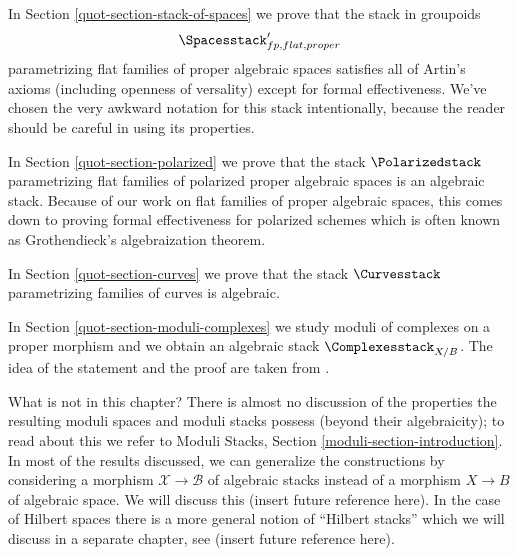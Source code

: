 \medskip\noindent
In Section \ref{quot-section-stack-of-spaces} we prove that the stack in
groupoids
$$
\Spacesstack'_{fp, flat, proper}
$$
parametrizing flat families of proper algebraic spaces satisfies all
of Artin's axioms (including openness of versality) except for
formal effectiveness. We've chosen the very awkward notation for
this stack intentionally, because the reader should be careful
in using its properties.

\medskip\noindent
In Section \ref{quot-section-polarized} we prove that the stack
$\Polarizedstack$
parametrizing flat families of polarized proper algebraic spaces
is an algebraic stack. Because of our work on flat families of proper
algebraic spaces, this comes down to proving
formal effectiveness for polarized schemes which is often known
as Grothendieck's algebraization theorem.

\medskip\noindent
In Section \ref{quot-section-curves} we prove that the stack
$\Curvesstack$ parametrizing families of curves is algebraic.

\medskip\noindent
In Section \ref{quot-section-moduli-complexes}
we study moduli of complexes on a proper morphism
and we obtain an algebraic stack $\Complexesstack_{X/B}$.
The idea of the statement and the proof are taken from
\cite{lieblich-complexes}.

\medskip\noindent
What is not in this chapter? There is almost no discussion of
the properties the resulting moduli spaces and moduli stacks
possess (beyond their algebraicity); to read about this we
refer to Moduli Stacks, Section \ref{moduli-section-introduction}.
In most of the results discussed, we can generalize the constructions
by considering a morphism $\mathcal{X} \to \mathcal{B}$ of algebraic
stacks instead of a morphism $X \to B$ of algebraic space.
We will discuss this (insert future reference here).
In the case of Hilbert spaces there is a more general notion of
``Hilbert stacks'' which we will discuss in a separate chapter, see
(insert future reference here).

